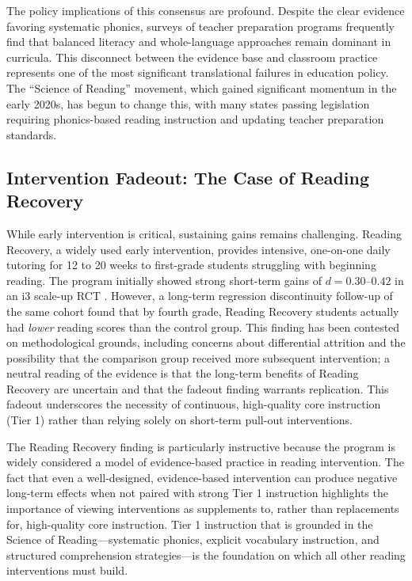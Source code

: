 \documentclass[12pt,letterpaper]{article}
\begin{document}
The policy implications of this consensus are profound. Despite the clear evidence favoring systematic phonics, surveys of teacher preparation programs frequently find that balanced literacy and whole-language approaches remain dominant in curricula. This disconnect between the evidence base and classroom practice represents one of the most significant translational failures in education policy. The ``Science of Reading'' movement, which gained significant momentum in the early 2020s, has begun to change this, with many states passing legislation requiring phonics-based reading instruction and updating teacher preparation standards.

\subsection{Intervention Fadeout: The Case of Reading Recovery}

While early intervention is critical, sustaining gains remains challenging. Reading Recovery, a widely used early intervention, provides intensive, one-on-one daily tutoring for 12 to 20 weeks to first-grade students struggling with beginning reading. The program initially showed strong short-term gains of $d = 0.30$--$0.42$ in an i3 scale-up RCT \citep{may2016}. However, a long-term regression discontinuity follow-up of the same cohort \citep{may2023} found that by fourth grade, Reading Recovery students actually had \textit{lower} reading scores than the control group. This finding has been contested on methodological grounds, including concerns about differential attrition and the possibility that the comparison group received more subsequent intervention; a neutral reading of the evidence is that the long-term benefits of Reading Recovery are uncertain and that the fadeout finding warrants replication. This fadeout underscores the necessity of continuous, high-quality core instruction (Tier 1) rather than relying solely on short-term pull-out interventions.

The Reading Recovery finding is particularly instructive because the program is widely considered a model of evidence-based practice in reading intervention. The fact that even a well-designed, evidence-based intervention can produce negative long-term effects when not paired with strong Tier 1 instruction highlights the importance of viewing interventions as supplements to, rather than replacements for, high-quality core instruction. Tier 1 instruction that is grounded in the Science of Reading---systematic phonics, explicit vocabulary instruction, and structured comprehension strategies---is the foundation on which all other reading interventions must build.
\end{document}
